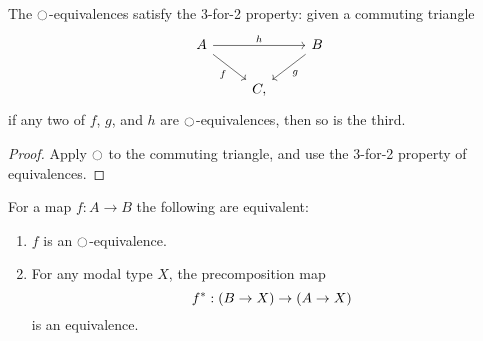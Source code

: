\documentclass[9pt,twosided]{amsart}
\begin{document}
\begin{lem}\label{lem:3for2_mequiv}
The ${\ocircle}$-equivalences satisfy the 3-for-2 property: given a commuting triangle
\begin{equation*}
\begin{tikzcd}
A \arrow[rr,"h"] \arrow[dr,swap,"f"] & & B \arrow[dl,"g"] \\
& C,
\end{tikzcd}
\end{equation*}
if any two of $f$, $g$, and $h$ are ${\ocircle}$-equivalences, then so is the third.
\end{lem}

\begin{proof}
Apply ${\ocircle}$ to the commuting triangle, and use the 3-for-2 property of equivalences.
\end{proof}

\begin{lem}\label{lem:modal_equivalence}
For a map $f : A \to B$ the following are equivalent:
\begin{enumerate}
\item $f$ is an ${\ocircle}$-equivalence.
\item For any modal type $X$, the precomposition map
\begin{equation*}
f^{\ast} : (B \to X) \to (A \to X)
\end{equation*}
is an equivalence.
\end{enumerate}
\end{lem}
\end{document}
